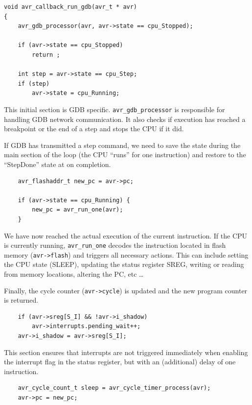 \begin{lstlisting}
void avr_callback_run_gdb(avr_t * avr)
{
    avr_gdb_processor(avr, avr->state == cpu_Stopped);

    if (avr->state == cpu_Stopped)
        return ;

    int step = avr->state == cpu_Step;
    if (step)
        avr->state = cpu_Running;
\end{lstlisting}

This initial section is \ac{GDB} specific. \lstinline|avr_gdb_processor| is responsible for
handling \ac{GDB} network communication. It also checks if execution has reached a
breakpoint or the end of a step and stops the \ac{CPU} if it did.

If \ac{GDB} has transmitted a step command, we need to save the state during the
main section of the loop (the \ac{CPU} ``runs'' for one instruction) and restore to
the ``StepDone'' state at on completion.

\begin{lstlisting}
    avr_flashaddr_t new_pc = avr->pc;

    if (avr->state == cpu_Running) {
        new_pc = avr_run_one(avr);
    }
\end{lstlisting}

We have now reached the actual execution of the current instruction. If the \ac{CPU}
is currently running, \lstinline|avr_run_one| decodes the instruction located in flash memory
(\lstinline|avr->flash|) and triggers all necessary actions. This can include setting the \ac{CPU}
state (SLEEP), updating the status register \ac{SREG}, writing or reading from memory
locations, altering the \ac{PC}, etc \ldots

Finally, the cycle counter (\lstinline|avr->cycle|) is updated and the new
program counter is returned.

\begin{lstlisting}
    if (avr->sreg[S_I] && !avr->i_shadow)
        avr->interrupts.pending_wait++;
    avr->i_shadow = avr->sreg[S_I];
\end{lstlisting}

This section ensures that interrupts are not triggered immediately when
enabling the interrupt flag in the status register, but with an (additional)
delay of one instruction.

\begin{lstlisting}
    avr_cycle_count_t sleep = avr_cycle_timer_process(avr);
    avr->pc = new_pc;
\end{lstlisting}

